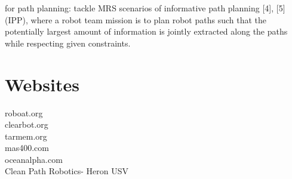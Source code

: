 \documentclass{article}
\begin{document}
for path planning: tackle MRS scenarios of informative path
planning [4], [5] (IPP), where a robot team mission is to plan robot paths such that the potentially largest amount of information is jointly extracted along the paths while respecting given constraints.




\section{Websites}

roboat.org \\
clearbot.org \\
tarmem.org \\
mas400.com \\
oceanalpha.com \\
Clean Path Robotics- Heron USV
\end{document}

